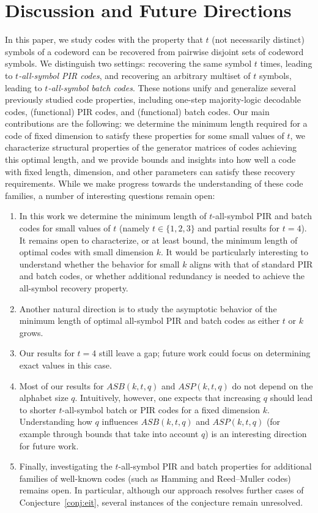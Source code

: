 \documentclass[11pt,a4paper]{article}
\theoremstyle{definition}
\begin{document}
\section{Discussion and Future Directions}\label{Sec:Conclustion}

{In this paper, we study codes with the property that $t$ (not necessarily distinct) symbols of a codeword can be recovered from pairwise disjoint sets of codeword symbols. We distinguish two settings: recovering the same symbol $t$ times, leading to \emph{$t$-all-symbol PIR codes}, and recovering an arbitrary multiset of $t$ symbols, leading to \emph{$t$-all-symbol batch codes}. These notions unify and generalize several previously studied code properties, including one-step majority-logic decodable codes, (functional) PIR codes, and (functional) batch codes.
Our main contributions are the following: we determine the minimum length required for a code of fixed dimension to satisfy these properties for some small values of $t$, we characterize structural properties of the generator matrices of codes achieving this optimal length, and we provide bounds and insights into how well a code with fixed length, dimension, and other parameters can satisfy these recovery requirements. While we make progress towards the understanding of these code families, a number of interesting questions remain open:
\begin{enumerate}
\item In this work we determine the minimum length of $t$-all-symbol PIR and batch codes for small values of $t$ (namely $t \in \{1,2,3\}$ and partial results for $t=4$). It remains open to characterize, or at least bound, the minimum length of optimal codes with small dimension $k$. It would be particularly interesting to understand whether the behavior for small $k$ aligns with that of standard PIR and batch codes, or whether additional redundancy is needed to achieve the all-symbol recovery property.
\item Another natural direction is to study the asymptotic behavior of the minimum length of optimal all-symbol PIR and batch codes as either $t$ or $k$ grows.
\item Our results for $t=4$ still leave a gap; future work could focus on determining exact values in this case.
\item Most of our results for $ASB(k,t,q)$ and $ASP(k,t,q)$ do not depend on the alphabet size $q$. Intuitively, however, one expects that increasing $q$ should lead to shorter $t$-all-symbol batch or PIR codes for a fixed dimension $k$. Understanding how $q$ influences $ASB(k,t,q)$ and $ASP(k,t,q)$ (for example through bounds that take into account $q$) is an interesting direction for future work.
\item Finally, investigating the $t$-all-symbol PIR and batch properties for additional families of well-known codes (such as Hamming and Reed--Muller codes) remains open. In particular, although our approach resolves further cases of Conjecture~\ref{conj:eit}, several instances of the conjecture remain unresolved.
\end{enumerate}
}
\end{document}
